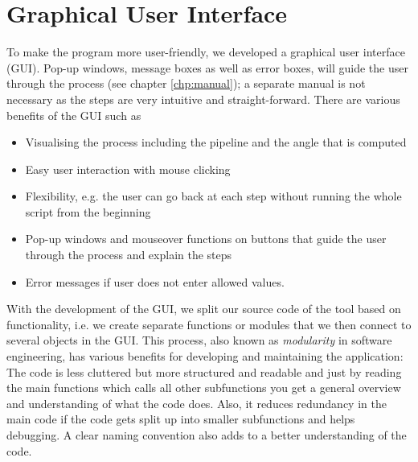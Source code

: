 
\section{Graphical User Interface}
To make the program more user-friendly, we developed a graphical user interface (GUI). Pop-up windows, message boxes as well as error boxes, will guide the user through the process (see chapter \ref{chp:manual}); a separate manual is not necessary as the steps are very intuitive and straight-forward.
There are various benefits of the GUI such as
\begin{itemize}
	\item Visualising the process including the pipeline and the angle that is computed
	\item Easy user interaction with mouse clicking
	\item Flexibility, e.g. the user can go back at each step without running the whole script from the beginning
	\item Pop-up windows and mouseover functions on buttons that guide the user through the process and explain the steps
	\item Error messages if user does not enter allowed values.
\end{itemize}


With the development of the GUI, we split our source code of the tool based on functionality, i.e. we create separate functions or modules that we then connect to several objects in the GUI. This process, also known as \textit{modularity} in software engineering, has various benefits for developing and maintaining the application: The code is less cluttered but more structured and readable and just by reading the main functions which calls all other subfunctions you get a general overview and understanding of what the code does. Also, it reduces redundancy in the main code if the code gets split up into smaller subfunctions and helps debugging. A clear naming convention also adds to a better understanding of the code.



